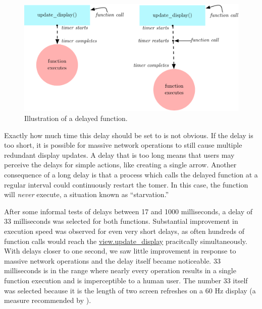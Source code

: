 \begin{figure}
	\centering
		\includegraphics[width=1\textwidth]{figures/waiting_period}
		\caption{Illustration of a delayed function.}
		\label{fig:waiting_period}
\end{figure}


Exactly how much time this delay should be set to is not obvious. If the delay is too short, it is possible for massive network operations to still cause multiple redundant display updates. A delay that is too long means that users may perceive the delays for simple actions, like creating a single arrow. Another consequence of a long delay is that a process which calls the delayed function at a regular interval could continuously restart the tomer. In this case, the function will \emph{never} execute, a situation known as ``starvation.''

After some informal tests of delays between 17 and 1000 milliseconds, a delay of 33 milliseconds was selected for both functions. Substantial improvement in execution speed was observed for even very short delays, as often hundreds of function calls would reach the \url{view.update_display} pracitcally simultaneously. With delays closer to one second, we saw little improvement in response to massive network operations and the delay itself became noticeable. 33 milliseconds is in the range where nearly every operation results in a single function execution and is imperceptible to a human user. The number 33 itself was selected because it is the length of two screen refreshes on a 60 Hz display (a measure recommended by ).
	
